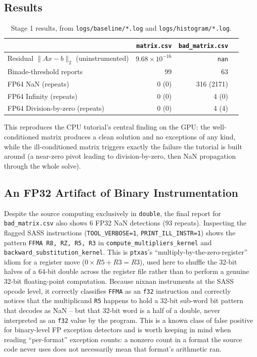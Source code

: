 \documentclass[11pt,a4paper]{article}
\begin{document}
\subsection{Results}

\begin{table}[h]
\centering
\begin{tabular}{lrrr}
\toprule
& \texttt{matrix.csv} & \texttt{bad\_matrix.csv} \\
\midrule
Residual $\lVert Ax-b\rVert_2$ (uninstrumented) & $9.68\times10^{-16}$ & \texttt{nan} \\
Binade-threshold reports & 99 & 63 \\
FP64 NaN (repeats) & 0 (0) & 316 (2171) \\
FP64 Infinity (repeats) & 0 (0) & 4 (0) \\
FP64 Division-by-zero (repeats) & 0 (0) & 4 (4) \\
\bottomrule
\end{tabular}
\caption{Stage 1 results, from \texttt{logs/baseline/*.log} and
\texttt{logs/histogram/*.log}.}
\label{tab:stage1}
\end{table}

This reproduces the CPU tutorial's central finding on the GPU: the
well-conditioned matrix produces a clean solution and no exceptions of any
kind, while the ill-conditioned matrix triggers exactly the failure the
tutorial is built around (a near-zero pivot leading to division-by-zero,
then NaN propagation through the whole solve).

\subsection{An FP32 Artifact of Binary Instrumentation}
\label{sec:fp32-artifact}

Despite the source computing exclusively in \texttt{double}, the final
report for \texttt{bad\_matrix.csv} also shows 6 FP32 NaN detections (93
repeats). Inspecting the flagged SASS instructions
(\texttt{TOOL\_VERBOSE=1}, \texttt{PRINT\_ILL\_INSTR=1}) shows the pattern
\texttt{FFMA R8, RZ, R5, R3} in \texttt{compute\_multipliers\_kernel} and
\texttt{backward\_substitution\_kernel}. This is \texttt{ptxas}'s
``multiply-by-the-zero-register'' idiom for a register move
($0 \times R5 + R3 = R3$), used here to shuffle the 32-bit halves of a
64-bit double across the register file rather than to perform a genuine
32-bit floating-point computation. Because nixnan instruments at the SASS
opcode level, it correctly classifies \texttt{FFMA} as an \texttt{f32}
instruction and correctly notices that the multiplicand \texttt{R5} happens
to hold a 32-bit sub-word bit pattern that decodes as NaN -- but that
32-bit word is a half of a double, never interpreted as an \texttt{f32}
value by the program. This is a known class of false positive for
binary-level FP exception detectors and is worth keeping in mind when
reading ``per-format'' exception counts: a nonzero count in a format the
source code never uses does not necessarily mean that format's arithmetic
ran.
\end{document}
